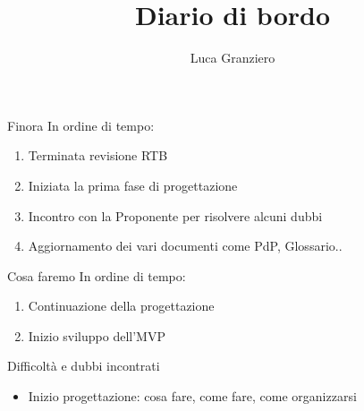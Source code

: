 \documentclass{beamer}
\title{Diario di bordo}
\author[Luca Granziero]{Luca Granziero}
\begin{document}
{ 
  \begin{frame}
    \titlepage
  \end{frame}
}

\begin{frame}{Finora}
  In ordine di tempo:
  \begin{enumerate}
    \item Terminata revisione RTB
    \item Iniziata la prima fase di progettazione 
    \item Incontro con la Proponente per risolvere alcuni dubbi 
    \item Aggiornamento dei vari documenti come PdP, Glossario.. 
  \end{enumerate}
\end{frame}

\begin{frame}{Cosa faremo}
  In ordine di tempo:
  \begin{enumerate}
    \item Continuazione della progettazione 
    \item Inizio sviluppo dell'MVP
  \end{enumerate}
\end{frame}


\begin{frame}{Difficoltà e dubbi incontrati}
  \begin{center}
  \begin{itemize}
    \item Inizio progettazione: cosa fare, come fare, come organizzarsi
  \end{itemize}
  \end{center}
\end{frame}
\end{document}
